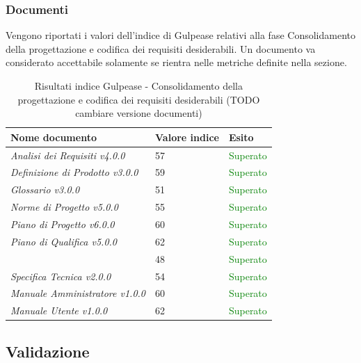 	 	\subsubsection{Documenti}	 	
	 	Vengono riportati i valori dell'indice di Gulpease relativi alla fase Consolidamento della progettazione e codifica dei requisiti desiderabili. Un documento va considerato accettabile solamente se rientra nelle metriche definite nella sezione.
		\begin{table}[!ht]
			\begin{center}
				\begin{tabularx}{0.9\textwidth}{|l|l|X|}
					\hline
					\textbf{Nome documento} & \textbf{Valore indice} & \textbf{Esito}\\
					\hline						
					\emph{Analisi dei Requisiti v4.0.0} & 57 & \textcolor{green}{Superato}\\
					\hline
					\emph{Definizione di Prodotto v3.0.0} & 59 & \textcolor{green}{Superato}\\
					\hline
					\emph{Glossario v3.0.0} & 51 & \textcolor{green}{Superato}\\
					\hline					
					\emph{Norme di Progetto v5.0.0} & 55 & \textcolor{green}{Superato}\\
					\hline					
					\emph{Piano di Progetto v6.0.0} & 60 & \textcolor{green}{Superato}\\
					\hline					
					\emph{Piano di Qualifica v5.0.0} & 62 & \textcolor{green}{Superato}\\
					\hline					
					\docNameVersionSdF & 48 & \textcolor{green}{Superato}\\
					\hline	
					\emph{Specifica Tecnica v2.0.0} & 54 & \textcolor{green}{Superato}\\
					\hline
					\emph{Manuale Amministratore v1.0.0} & 60 & \textcolor{green}{Superato}\\
					\hline
					\emph{Manuale Utente v1.0.0} & 62 & \textcolor{green}{Superato}\\			
					\hline	
					\hline			
				\end{tabularx}
			\end{center}
			\caption{Risultati indice Gulpease - Consolidamento della progettazione e codifica dei requisiti desiderabili (TODO cambiare versione documenti)}
		\end{table}

	\subsection{Validazione}
		\label{sub:validazione}
